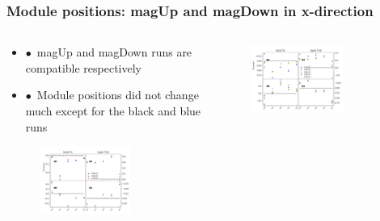 \documentclass[aspectratio=1610, 12pt]{beamer}
\begin{document}
\begin{frame}\frametitle{Module positions: magUp and magDown in x-direction}
  \begin{columns}
    \begin{column}[c]{0.48\textwidth}
      \begin{itemize}
        \item $\bullet$\, magUp and magDown runs are compatible respectively
        \item $\bullet$\, Module positions did not change much except for the black and blue runs
      \end{itemize}
      \begin{figure}
        \includegraphics[width=0.7\textwidth]{plots/plain_data/raw_MU_T1U_Tx.pdf}
      \end{figure}
    \end{column}
    \begin{column}[c]{0.48\textwidth}
      \begin{figure}
        \includegraphics[width=0.7\textwidth]{plots/plain_data/raw_MD_T1U_Tx.pdf}
      \end{figure}
    \end{column}
  \end{columns}
\end{frame}
\end{document}
